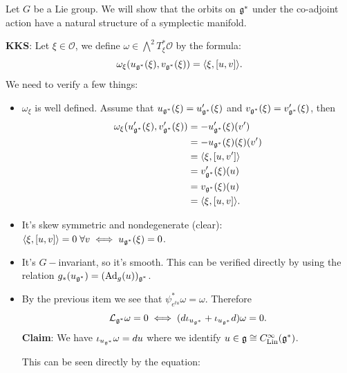     Let $G$ be a Lie group. We will show that the orbits on $\mathfrak{g}^*$ under the co-adjoint action have a natural
    structure of a symplectic manifold.\par
    \textbf{KKS}: Let $\xi\in\mathcal{O}$, we define $\omega\in\bigwedge^2T_\xi^*\mathcal{O}$ by the formula: 
    \begin{equation}
        \omega_\xi(u_{\mathfrak{g}^*}(\xi),v_{\mathfrak{g}^*}(\xi))=\langle\xi,[u,v] \rangle.
    \end{equation}
    We need to verify a few things:
\begin{itemize}
    \item $\omega_\xi$ is well defined. Assume that $u_{\mathfrak{g}^*}(\xi)=u_{\mathfrak{g}^*}^\prime(\xi)$ and 
    $v_{\mathfrak{g}^*}(\xi)=v_{\mathfrak{g}^*}^\prime(\xi)$, then 
    \begin{equation}
        \begin{split}
            \omega_\xi(u_{\mathfrak{g}^*}^\prime(\xi),v_{\mathfrak{g}^*}^\prime(\xi))&=
            -u_{\mathfrak{g}^*}^\prime(\xi)(v^\prime)\\
            &=-u_{\mathfrak{g}^*}(\xi)(\xi)(v^\prime)\\
            &=\langle \xi,[u,v^\prime] \rangle\\
            &=v_{\mathfrak{g}^*}^\prime(\xi)(u)\\
            &=v_{\mathfrak{g}^*}(\xi)(u)\\
            &=\langle\xi,[u,v] \rangle.
        \end{split}
    \end{equation}
    \item It's skew symmetric and nondegenerate (clear): $\langle\xi,[u,v] \rangle=0\;\forall v\iff u_{\mathfrak{g}^*}(\xi)=0$.
    \item It's $G-$invariant, so it's smooth. This can be verified directly by using the relation $g_*(u_{\mathfrak{g}^*})=(\text{Ad}_g(u))_{\mathfrak{g}^*}$.
    \item By the previous item we see that $\psi_{e^{tu}}^*\omega=\omega$. Therefore 
    \begin{equation}
        \mathcal{L}_{\mathfrak{g}^*}\omega=0\iff (d\iota_{u_{\mathfrak{g}^*}}+\iota_{u_{\mathfrak{g}^*}}d)\omega=0.
    \end{equation}
    \textbf{Claim}: We have $\iota_{u_{\mathfrak{g}^*}}\omega=du$ where we identify $u\in\mathfrak{g}\cong C^\infty_{\text{Lin}}(\mathfrak{g}^*)$.\par 
    This can be seen directly by the equation:
    \begin{equation}
        \begin{split}

\end{split}
\end{equation}
\end{itemize}
